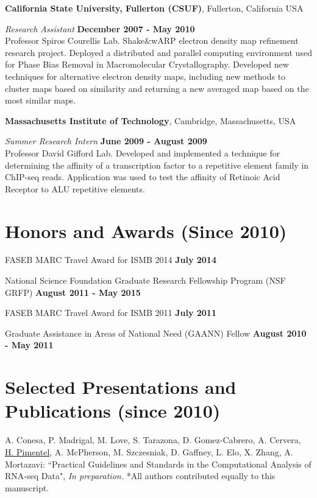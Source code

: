 \documentclass[margin,line]{res}
\begin{document}
\begin{resume}
{\bf California State University, Fullerton (CSUF)}, Fullerton, California USA
\vspace{-.3cm}

{\em Research Assistant} \hfill {\bf December 2007 - May 2010}\\
Professor Spiros Courellis Lab. Shake\&wARP electron density map refinement
research project. Deployed a distributed and parallel computing environment used
for Phase Bias Removal in Macromolecular Crystallography. Developed new
techniques for alternative electron density maps, including new methods to
cluster maps based on similarity and returning a new averaged map based on the
most similar maps.

\newpage

{\bf Massachusetts Institute of Technology}, Cambridge, Massachusetts,
USA 

\vspace{-.3cm}
{\em Summer Research Intern} \hfill {\bf June 2009 - August 2009}\\
Professor David Gifford Lab. Developed and implemented a technique for
determining the affinity of a transcription factor to a repetitive element
family in ChIP-seq reads. Application was used to test the affinity of Retinoic
Acid Receptor to ALU repetitive elements.

\section{\sc Honors and Awards (Since 2010)}
FASEB MARC Travel Award for ISMB 2014 \hfill {\bf July 2014}

National Science Foundation Graduate Research Fellowship Program (NSF GRFP)
\hfill {\bf August 2011 - May 2015}

FASEB MARC Travel Award for ISMB 2011 \hfill {\bf July 2011}

Graduate Assistance in Areas of National Need (GAANN) Fellow \hfill {\bf August
  2010 - May 2011}

\section{\sc Selected Presentations and Publications (since 2010)}

A. Conesa, P. Madrigal, M. Love, S. Tarazona, D. Gomez-Cabrero, A. Cervera,
\underline{H. Pimentel}, A. McPherson, M. Szczesniak, D. Gaffney, L. Elo, X.
Zhang, A. Mortazavi: ``Practical Guidelines and Standards in the Computational
Analysis of RNA-seq Data", {\emph{In preparation.}} *All authors contributed
equally to this manuscript.


\end{resume}
\end{document}
